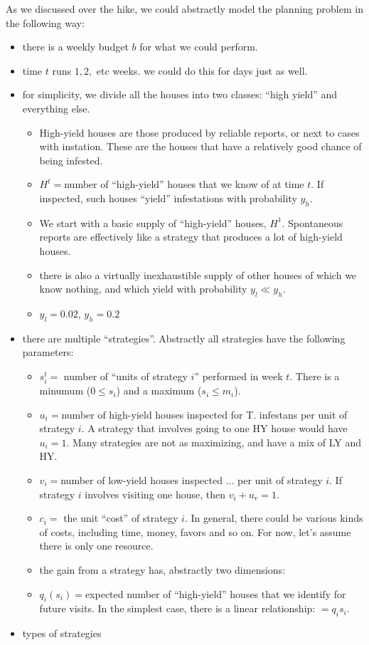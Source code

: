 \documentclass[english]{paper}
\begin{document}
As we discussed over the hike, we could abstractly model the planning
problem in the following way:
\begin{itemize}
\item there is a weekly budget $b$ for what we could perform.
\item time $t$ runs $1,2,$ etc weeks. we could do this for days just as
well.
\item for simplicity, we divide all the houses into two classes: ``high
yield'' and everything else.

\begin{itemize}
\item High-yield houses are those produced by reliable reports, or next
to cases with instation. These are the houses that have a relatively
good chance of being infested.
\item $H^{t}=$number of ``high-yield'' houses that we know of at time
$t$. If inspected, such houses ``yield'' infestations with probability
$y_{h}$. 
\item We start with a basic supply of ``high-yield'' houses, $H^{1}$.
Spontaneous reports are effectively like a strategy that produces
a lot of high-yield houses.
\item there is also a virtually inexhaustible supply of other houses of
which we know nothing, and which yield with probability $y_{l}\ll y_{h}$.
\item $y_{l}=0.02$, $y_{h}=0.2$
\end{itemize}
\item there are multiple ``strategies''. Abstractly all strategies have
the following parameters:

\begin{itemize}
\item $s_{i}^{t}=$ number of ``units of strategy $i$'' performed in
week $t$. There is a minumum ($0\leq s_{i}$) and a maximum ($s_{i}\leq m_{i}$).
\item $u_{i}=$number of high-yield houses inspected for T. infestans per
unit of strategy $i$. A strategy that involves going to one HY house
would have $u_{i}=1$. Many strategies are not as maximizing, and
have a mix of LY and HY.
\item $v_{i}=$number of low-yield houses inspected ... per unit of strategy
$i$. If strategy $i$ involves visiting one house, then $v_{i}+u_{v}=1$.
\item $c_{i}=$ the unit ``cost'' of strategy $i$. In general, there
could be various kinds of costs, including time, money, favors and
so on. For now, let's assume there is only one resource.
\item the gain from a strategy has, abstractly two dimensions:
\item $q_{i}(s_{i})=$expected number of ``high-yield'' houses that we
identify for future visits. In the simplest case, there is a linear
relationship: $=q_{i}s_{i}$. 
\end{itemize}
\item types of strategies


\end{itemize}
\end{document}

